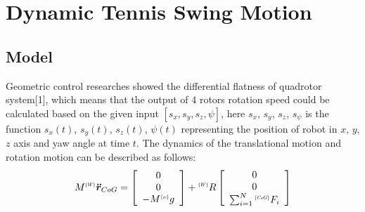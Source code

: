 \documentclass{jarticle}
\begin{document}
\section{Dynamic Tennis Swing Motion}

\subsection{Model}
Geometric control researches showed the differential flatness of quadrotor  system[1], which means that the output of 4 rotors rotation speed could be calculated based on the given input $[s_x, s_y, s_z, ψ]$, here $s_x$, $s_y$, $s_z$, $s_ψ$ is the function $s_x(t)$, $s_y(t)$, $s_z(t)$, $ψ(t)$  representing the position of robot in $x$, $y$, $z$ axis and yaw angle at time $t$.
The dynamics of the translational motion and rotation motion can be described as follows:
\begin{equation}
  \label{eq:model1}
  M^{\scalebox{.5}{$\{W\}$}}\bm{\ddot{r}}_{CoG} =\left[ \begin{array}{c}
      0 \\
      0 \\
      -M^{\scalebox{.5}{$\{w\}$}}g
    \end{array}\right]
  + {}^{\scalebox{.5}{$\{W\}$}}R \left[ \begin{array}{c}
        0 \\
        0 \\
        \sum_{i=1}^{N} {}^{\scalebox{.5}{$\{CoG\}$}}F_i
      \end{array}\right]
\end{equation}
\end{document}
